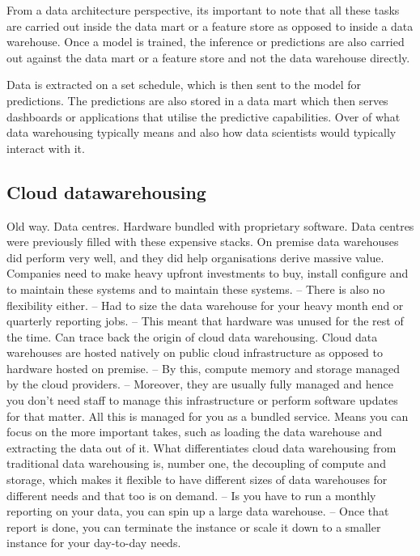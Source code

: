 \documentclass[a4paper, 11pt]{article}
\begin{document}
    From a data architecture perspective, its important to note that all these tasks are carried out inside the data mart or a feature store as opposed to inside a data warehouse.
    Once a model is trained, the inference or predictions are also carried out against the data mart or a feature store and not the data warehouse directly.

    Data is extracted on a set schedule, which is then sent to the model for predictions.
    The predictions are also stored in a data mart which then serves dashboards or applications that utilise the predictive capabilities.
    Over of what data warehousing typically means and also how data scientists would typically interact with it.

    \subsection{Cloud datawarehousing}

    Old way. Data centres. Hardware bundled with proprietary software.
    Data centres were previously filled with these expensive stacks.
    On premise data warehouses did perform very well, and they did help organisations derive massive value.
    Companies need to make heavy upfront investments to buy, install configure and to maintain these systems and to maintain these systems.
    -- There is also no flexibility either.
    -- Had to size the data warehouse for your heavy month end or quarterly reporting jobs.
    -- This meant that hardware was unused for the rest of the time.
    Can trace back the origin of cloud data warehousing.
    Cloud data warehouses are hosted natively on public cloud infrastructure as opposed to hardware hosted on premise.
    -- By this, compute memory and storage managed by the cloud providers.
    -- Moreover, they are usually fully managed and hence you don't need staff to manage this infrastructure or perform software updates for that matter.
    All this is managed for you as a bundled service.
    Means you can focus on the more important takes, such as loading the data warehouse and extracting the data out of it.
    What differentiates cloud data warehousing from traditional data warehousing is, number one, the decoupling of compute and storage, which makes it flexible to have different sizes of data warehouses for different needs and that too is on demand.
    -- Is you have to run a monthly reporting on your data, you can spin up a large data warehouse.
    -- Once that report is done, you can terminate the instance or scale it down to a smaller instance for your day-to-day needs.
\end{document}
